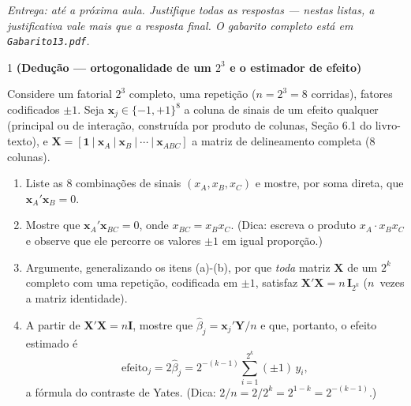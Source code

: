 \documentclass[11pt]{article}
\begin{document}

\noindent \textit{Entrega: até a próxima aula. Justifique todas as respostas --- nestas listas, a
justificativa vale mais que a resposta final. O gabarito completo está em \texttt{Gabarito13.pdf}.}

\begin{questao}{1} \textbf{(Dedução --- ortogonalidade de um $2^3$ e o estimador de efeito)}

Considere um fatorial $2^3$ completo, uma repetição ($n=2^3=8$ corridas), fatores codificados
$\pm1$. Seja $\mathbf{x}_j \in \{-1,+1\}^8$ a coluna de sinais de um efeito qualquer (principal ou
de interação, construída por produto de colunas, Seção 6.1 do livro-texto), e
$\mathbf{X} = [\mathbf{1}\ |\ \mathbf{x}_A\ |\ \mathbf{x}_B\ |\ \cdots\ |\ \mathbf{x}_{ABC}]$ a
matriz de delineamento completa (8 colunas).

\begin{enumerate}[label=(\alph*)]
  \item Liste as 8 combinações de sinais $(x_A,x_B,x_C)$ e mostre, por soma direta, que
    $\mathbf{x}_A'\mathbf{x}_B = 0$.
  \item Mostre que $\mathbf{x}_A'\mathbf{x}_{BC} = 0$, onde $x_{BC}=x_Bx_C$. (Dica: escreva o
    produto $x_A\cdot x_Bx_C$ e observe que ele percorre os valores $\pm1$ em igual proporção.)
  \item Argumente, generalizando os itens (a)-(b), por que \emph{toda} matriz $\mathbf{X}$ de um
    $2^k$ completo com uma repetição, codificada em $\pm1$, satisfaz $\mathbf{X}'\mathbf{X} =
    n\,\mathbf{I}_{2^k}$ ($n\,$ vezes a matriz identidade).
  \item A partir de $\mathbf{X}'\mathbf{X}=n\mathbf{I}$, mostre que $\hat\beta_j =
    \mathbf{x}_j'\mathbf{Y}/n$ e que, portanto, o efeito estimado é
    $$\text{efeito}_j = 2\hat\beta_j = 2^{-(k-1)}\sum_{i=1}^{2^k} (\pm1)\,y_i,$$
    a fórmula do contraste de Yates. (Dica: $2/n = 2/2^k = 2^{1-k} = 2^{-(k-1)}$.)
\end{enumerate}
\end{questao}
\end{document}
